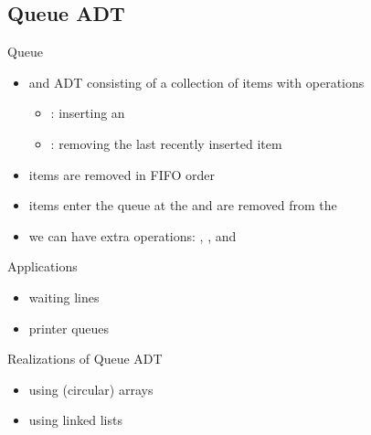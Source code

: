 \documentclass[letterpaper, 12pt]{article}
\newcommand{\red}[1]{{\color{red}{#1}}}
\begin{document}
    \subsection{Queue ADT}
    Queue
    \begin{itemize}
        \item and ADT consisting of a collection of items with operations
        \begin{itemize}
            \item \red{enqueue}: inserting an 
            \item \red{dequeue}: removing the last recently inserted item
        \end{itemize}
        \item items are removed in FIFO order
        \item items enter the queue at the \red{rear} and are removed from the \red{front}
        \item we can have extra operations: \red{size}, \red{isEmpty}, and \red{front}
    \end{itemize}
    Applications
    \begin{itemize}
        \item waiting lines
        \item printer queues
    \end{itemize}
    Realizations of Queue ADT
    \begin{itemize}
        \item using (circular) arrays
        \item using linked lists
    \end{itemize}
    \bigskip
\end{document}
